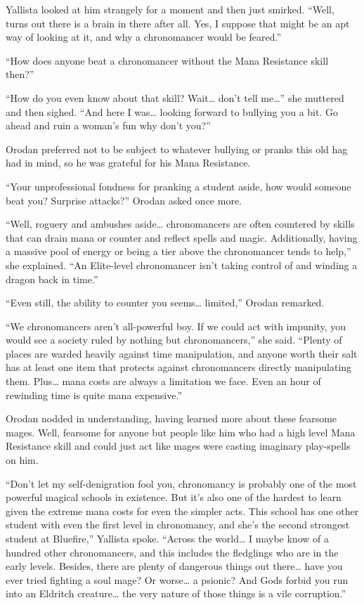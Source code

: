 \documentclass[a4paper,10pt]{book}
\begin{document}
Yallista looked at him strangely for a moment and then just smirked. “Well, turns out there is a brain in there after all. Yes, I suppose that might be an apt way of looking at it, and why a chronomancer would be feared.”\par
“How does anyone beat a chronomancer without the Mana Resistance skill then?”\par
“How do you even know about that skill? Wait… don’t tell me…” she muttered and then sighed. “And here I was… looking forward to bullying you a bit. Go ahead and ruin a woman’s fun why don’t you?”\par
Orodan preferred not to be subject to whatever bullying or pranks this old hag had in mind, so he was grateful for his Mana Resistance.\par
“Your unprofessional fondness for pranking a student aside, how would someone beat you? Surprise attacks?” Orodan asked once more.\par
“Well, roguery and ambushes aside… chronomancers are often countered by skills that can drain mana or counter and reflect spells and magic. Additionally, having a massive pool of energy or being a tier above the chronomancer tends to help,” she explained. “An Elite-level chronomancer isn’t taking control of and winding a dragon back in time.”\par
“Even still, the ability to counter you seems… limited,” Orodan remarked.\par
“We chronomancers aren’t all-powerful boy. If we could act with impunity, you would see a society ruled by nothing but chronomancers,” she said. “Plenty of places are warded heavily against time manipulation, and anyone worth their salt has at least one item that protects against chronomancers directly manipulating them. Plus… mana costs are always a limitation we face. Even an hour of rewinding time is quite mana expensive.”\par
Orodan nodded in understanding, having learned more about these fearsome mages. Well, fearsome for anyone but people like him who had a high level Mana Resistance skill and could just act like mages were casting imaginary play-spells on him.\par
“Don’t let my self-denigration fool you, chronomancy is probably one of the most powerful magical schools in existence. But it’s also one of the hardest to learn given the extreme mana costs for even the simpler acts. This school has one other student with even the first level in chronomancy, and she’s the second strongest student at Bluefire,” Yallista spoke. “Across the world… I maybe know of a hundred other chronomancers, and this includes the fledglings who are in the early levels. Besides, there are plenty of dangerous things out there… have you ever tried fighting a soul mage? Or worse… a psionic? And Gods forbid you run into an Eldritch creature… the very nature of those things is a vile corruption.”\par
\end{document}
